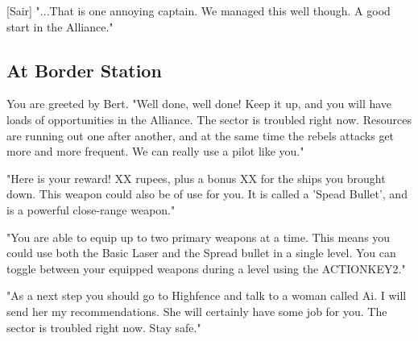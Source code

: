\documentclass[a4paper,12pt]{article}
\begin{document}
[Sair] "...That is one annoying captain. We managed this well though. A good start in the Alliance."

\subsection{At Border Station}

You are greeted by Bert. "Well done, well done! Keep it up, and you will have loads of opportunities
in the Alliance. The sector is troubled right now. Resources are running out one after another,
and at the same time the rebels attacks get more and more frequent. We can really use a pilot like you."

"Here is your reward! XX rupees, plus a bonus XX for the ships you brought down. This weapon could also be of use
for you. It is called a 'Spead Bullet', and is a powerful close-range weapon."

"You are able to equip up to two primary weapons at a time. This means you could use both the Basic Laser and 
the Spread bullet in a single level. You can toggle between your equipped weapons during a level using the ACTIONKEY2."

"As a next step you should go to Highfence and talk to a woman called Ai. I will send her my recommendations.
She will certainly have some job for you. The sector is troubled right now. Stay safe."
\end{document}
